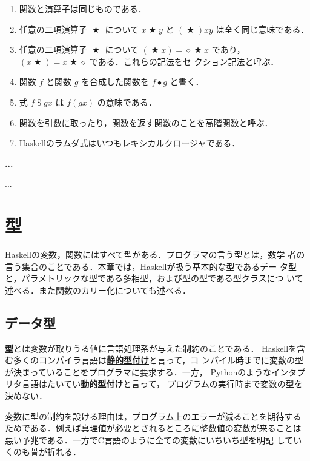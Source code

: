 \documentclass[a5paper,twoside,fleqn,draft]{jsbook}
\newcommand{\programminglanguage}[1]{\textsf{#1}}
\newcommand{\clang}{\programminglanguage{C}}
\newcommand{\haskell}{\programminglanguage{Haskell}}
\newcommand{\python}{\programminglanguage{Python}}
\newenvironment{leader}{\begingroup\gt}{\endgroup}
\newenvironment{note}[1]{\begin{boxnote}\begin{center}\textbf{#1}\end{center}}{\end{boxnote}}
\newcommand{\keyword}[1]{{\underline{\textbf{#1}}}}
\newcommand{\mAnonParam}{\diamond}
\DeclareMathOperator{\mApply}{\$}
\DeclareMathOperator{\mBinOp}{\bigstar}
\DeclareMathOperator{\mComp}{\bullet} %
\begin{document}
\begin{enumerate}
\item 関数と演算子は同じものである．\item 任意の二項演算子 $\mBinOp$
  について $x\mBinOp y$ と $(\mBinOp)xy$ は全く同じ意味である．\item
  任意の二項演算子 $\mBinOp$ について $(\mBinOp x)=\mAnonParam\mBinOp
  x$ であり，$(x\mBinOp)=x\mBinOp\mAnonParam$ である．これらの記法をセ
  クション記法と呼ぶ．\item 関数 $f$ と関数 $g$ を合成した関数を
  $f\mComp g$ と書く．\item 式 $f\mApply gx$ は $f(gx)$ の意味である．
\item 関数を引数に取ったり，関数を返す関数のことを高階関数と呼ぶ．
\item \haskell のラムダ式はいつもレキシカルクロージャである．
\end{enumerate}

\begin{note}{...}
...
\end{note}

\chapter{型}
\label{ch:type}

\begin{leader}
\haskell の変数，関数にはすべて型がある．プログラマの言う型とは，数学
者の言う集合のことである．本章では，\haskell が扱う基本的な型であるデー
タ型と，パラメトリックな型である多相型，および型の型である型クラスにつ
いて述べる．また関数のカリー化についても述べる．
\end{leader}

\section{データ型}

\keyword{型}とは変数が取りうる値に言語処理系が与えた制約のことである．
\haskell を含む多くのコンパイラ言語は\keyword{静的型付け}と言って，コ
ンパイル時までに変数の型が決まっていることをプログラマに要求する．一方，
\python のようなインタプリタ言語はたいてい\keyword{動的型付け}と言って，
プログラムの実行時まで変数の型を決めない．

変数に型の制約を設ける理由は，プログラム上のエラーが減ることを期待する
ためである．例えば真理値が必要とされるところに整数値の変数が来ることは
悪い予兆である．一方で\clang 言語のように全ての変数にいちいち型を明記
していくのも骨が折れる．
\end{document}
